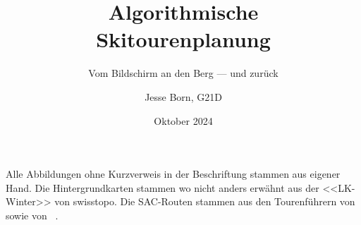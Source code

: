 \documentclass[a4paper, listof=numbered]{scrarticle}
\title{\AKAfont\Huge\textcolor{AKSAcolor}{Algorithmische\\Skitourenplanung}}
\subtitle{Vom Bildschirm an den Berg --- und zurück}
\author{Jesse Born, G21D}
\date{Oktober 2024}
\begin{document}

\maketitle

\tableofcontents

% 






\clearpage


\printbibliography[heading=bibnumbered]
\clearpage

\appendix
{}
\printglossary[type=\acronymtype, title={Abkürzungsverzeichnis}, nonumberlist]
\clearpage
\listoffigures
{}
Alle Abbildungen ohne Kurzverweis in der Beschriftung stammen aus eigener Hand. Die Hintergrundkarten stammen wo nicht anders erwähnt aus der <<LK-Winter>> von swisstopo. Die SAC-Routen stammen aus den Tourenführern  von   \citeauthor{mmzentralch} sowie  von \citeauthor{twslstgallappzll}~\cite{mmzentralch}\cite{twslstgallappzll}.
\clearpage

\end{document}
